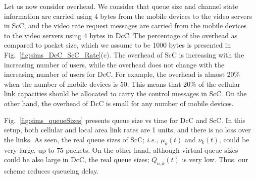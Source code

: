 \documentclass[conference]{IEEEtran}
\newcommand{\ie}{{\em i.e., }}
\begin{document}
\begin{figure*}[t!]
\centering
{}
\vspace{-5pt}
\caption{Queue Sizes. (a) ScC. Queue sizes at the source. (b) ScC. Queue sizes at the mobile devices. (c) DcC. Real queue sizes at the mobile devices. (d) Virtual queue sizes at the mobile devices.}
\vspace{-5pt}
\label{fig:sims_queueSizes}
\end{figure*}



Let us now consider overhead. We consider that queue size and channel state information are carried using 4 bytes from the mobile devices to the video servers in ScC, and the video rate request messages are carried from the mobile devices to the video servers using 4 bytes in DcC. The percentage of the overhead as compared to packet size, which we assume to be 1000 bytes is presented in Fig.~\ref{fig:sims_DcC_ScC_Rate}(c). The overhead of ScC is increasing with the increasing number of users, while the overhead does not change with the increasing number of users for DcC. For example, the overhead is almost 20\% when the number of mobile devices is 50. This means that 20\% of the cellular link capacities should be allocated to carry the control messages in ScC. On the other hand, the overhead of DcC is small for any number of mobile devices.


Fig.~\ref{fig:sims_queueSizes} presents queue size vs time for DcC and ScC. In this setup, both cellular and local area link rates are 1 units, and there is no loss over the links. As seen, the real queue sizes of ScC; \ie $\mu_{k}(t)$ and $\nu_{k}(t)$, could be very large, up to 75 packets. On the other hand, although virtual queue sizes could be also large in DcC, the real queue sizes; $Q_{n,k}(t)$ is very low. Thus, our scheme reduces queueing delay. 
\end{document}
